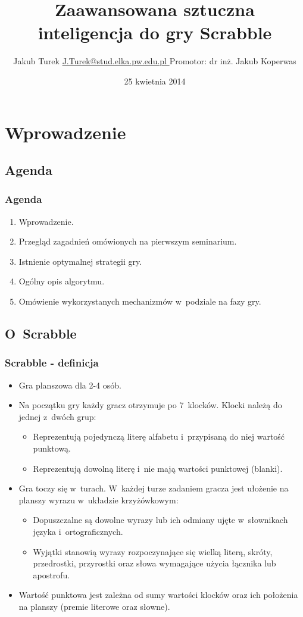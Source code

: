 \documentclass[10pt,a4paper]{beamer}
\author[Jakub Turek]{\texorpdfstring{Jakub Turek \newline \href{mailto:J.Turek@stud.elka.pw.edu.pl}{ J.Turek@stud.elka.pw.edu.pl }}{Jakub Turek} \newline \vskip2pt {\small Promotor: dr inż. Jakub Koperwas}}
\title{Zaawansowana sztuczna inteligencja do gry Scrabble}
\institute{Wydział Elektroniki i~Technik Informacyjnych}
\date{25 kwietnia 2014}
\begin{document}
\begin{frame}
	\titlepage
\end{frame}

\section{Wprowadzenie}
\subsection{Agenda}

\begin{frame}
	\frametitle{Agenda}

	\begin{enumerate}
		\item Wprowadzenie.
		\item Przegląd zagadnień omówionych na pierwszym seminarium.
		\item Istnienie optymalnej strategii gry.
		\item Ogólny opis algorytmu.
		\item Omówienie wykorzystanych mechanizmów w~podziale na fazy gry.
	\end{enumerate}
\end{frame}

\subsection{O~Scrabble}

\begin{frame}
	\frametitle{Scrabble - definicja}

	\begin{itemize}
		\item Gra planszowa dla 2-4 osób.
		\item Na początku gry każdy gracz otrzymuje po 7~klocków. Klocki należą do jednej z~dwóch grup:
			\begin{itemize}
				\item Reprezentują pojedynczą literę alfabetu i~przypisaną do niej wartość punktową.
				\item Reprezentują dowolną literę i~nie mają wartości punktowej (blanki).
			\end{itemize}
		\item Gra toczy się w~turach. W~każdej turze zadaniem gracza jest ułożenie na planszy wyrazu w~układzie krzyżówkowym:
			\begin{itemize}
				\item Dopuszczalne są dowolne wyrazy lub ich odmiany ujęte w~słownikach języka i~ortograficznych.
				\item Wyjątki stanowią wyrazy rozpoczynające się wielką literą, skróty, przedrostki, przyrostki oraz słowa wymagające użycia łącznika lub apostrofu. 
			\end{itemize}
		\item Wartość punktowa jest zależna od sumy wartości klocków oraz ich położenia na planszy (premie literowe oraz słowne).
	\end{itemize}
\end{frame}
\end{document}
